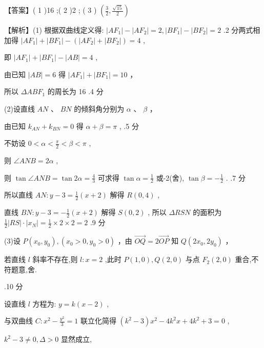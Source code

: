 \documentclass[10pt]{article}
\begin{document}
【答案】( 1 )16 ;( 2 )2 ; ( 3 ) \(\left( {\frac{3}{2},\frac{\sqrt{15}}{2}}\right)\)

【解析】(1) 根据双曲线定义得: \(\left| {A{F}_{1}}\right|  - \left| {A{F}_{2}}\right|  = 2,\left| {B{F}_{1}}\right|  - \left| {B{F}_{2}}\right|  = 2\) .2 分两式相加得 \(\left| {A{F}_{1}}\right|  + \left| {B{F}_{1}}\right|  - \left( {\left| {A{F}_{2}}\right|  + \left| {B{F}_{2}}\right| }\right)  = 4\) ,

即 \(\left| {A{F}_{1}}\right|  + \left| {B{F}_{1}}\right|  - \left| {AB}\right|  = 4\) ,

由已知 \(\left| {AB}\right|  = 6\) 得 \(\left| {A{F}_{1}}\right|  + \left| {B{F}_{1}}\right|  = {10}\) ，

所以 \({\Delta AB}{F}_{1}\) 的周长为 16 .4 分

(2)设直线 \({AN}\text{ 、 }{BN}\) 的倾斜角分别为 \(\alpha \text{ 、 }\beta\) ，

由已知 \({k}_{AN} + {k}_{BN} = 0\) 得 \(\alpha  + \beta  = \pi\) , .5 分

不妨设 \(0 < \alpha  < \frac{\pi }{2} < \beta  < \pi\) ,

则 \(\angle {ANB} = {2\alpha }\) ,

则 \(\tan \angle {ANB} = \tan {2\alpha } = \frac{4}{3}\) 可求得 \(\tan \alpha  = \frac{1}{2}\) 或-2(舍), \(\tan \beta  =  - \frac{1}{2}\) . .7 分

所以直线 \({AN} : y - 3 = \frac{1}{2}\left( {x + 2}\right)\) 解得 \(R\left( {0,4}\right)\) ,

直线 \({BN} : y - 3 =  - \frac{1}{2}\left( {x + 2}\right)\) 解得 \(S\left( {0,2}\right)\) , 所以 \({\Delta RSN}\) 的面积为 \(\frac{1}{2}\left| {RS}\right|  \cdot  \left| {x}_{N}\right|  = \frac{1}{2} \times  2 \times  2 = 2\) .9 分

(3)设 \(P\left( {{x}_{0},{y}_{0}}\right) ,\left( {{x}_{0} > 0,{y}_{0} > 0}\right)\) ，由 \(\overrightarrow{OQ} = 2\overrightarrow{OP}\) 知 \(Q\left( {2{x}_{0},2{y}_{0}}\right)\) ，

若直线 \(l\) 斜率不存在,则 \(l : x = 2\) ,此时 \(P\left( {1,0}\right) ,Q\left( {2,0}\right)\) 与点 \({F}_{2}\left( {2,0}\right)\) 重合,不符题意,舍.

.10 分

设直线 \(l\) 方程为: \(y = k\left( {x - 2}\right)\) ,

与双曲线 \(C : {x}^{2} - \frac{{y}^{2}}{3} = 1\) 联立化简得 \(\left( {{k}^{2} - 3}\right) {x}^{2} - 4{k}^{2}x + 4{k}^{2} + 3 = 0\) ,

\({k}^{2} - 3 \neq  0,\Delta  > 0\) 显然成立,
\end{document}
